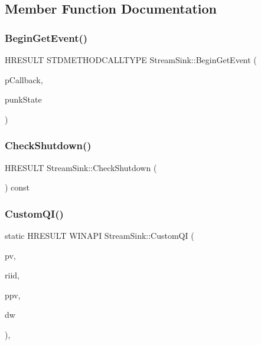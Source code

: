 \subsection{Member Function Documentation}
\mbox{\label{class_stream_sink_a1ed2f991ffbddfedb37c9aaa8e47092a}} 
\subsubsection{\texorpdfstring{Begin\+Get\+Event()}{BeginGetEvent()}}
{\footnotesize\ttfamily H\+R\+E\+S\+U\+LT S\+T\+D\+M\+E\+T\+H\+O\+D\+C\+A\+L\+L\+T\+Y\+PE Stream\+Sink\+::\+Begin\+Get\+Event (\begin{DoxyParamCaption}\item[{I\+M\+F\+Async\+Callback $\ast$}]{p\+Callback,  }\item[{I\+Unknown $\ast$}]{punk\+State }\end{DoxyParamCaption})\hspace{0.3cm}{\ttfamily [inline]}}

\mbox{\label{class_stream_sink_ae9d49228e64c14d5bb874dc10a6a6e5e}} 
\subsubsection{\texorpdfstring{Check\+Shutdown()}{CheckShutdown()}}
{\footnotesize\ttfamily H\+R\+E\+S\+U\+LT Stream\+Sink\+::\+Check\+Shutdown (\begin{DoxyParamCaption}{ }\end{DoxyParamCaption}) const\hspace{0.3cm}{\ttfamily [inline]}}

\mbox{\label{class_stream_sink_aae85bbd537c1ae2ef002701a9d382e4a}} 
\subsubsection{\texorpdfstring{Custom\+Q\+I()}{CustomQI()}}
{\footnotesize\ttfamily static H\+R\+E\+S\+U\+LT W\+I\+N\+A\+PI Stream\+Sink\+::\+Custom\+QI (\begin{DoxyParamCaption}\item[{void $\ast$}]{pv,  }\item[{R\+E\+F\+I\+ID}]{riid,  }\item[{L\+P\+V\+O\+ID $\ast$}]{ppv,  }\item[{D\+W\+O\+R\+D\+\_\+\+P\+TR}]{dw }\end{DoxyParamCaption})\hspace{0.3cm}{\ttfamily [inline]}, {\ttfamily [static]}}

